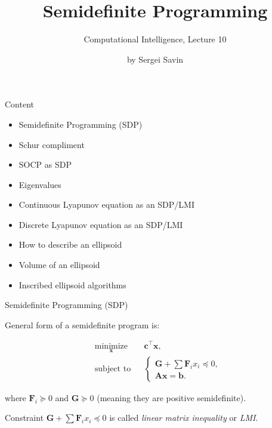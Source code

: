 \documentclass{beamer}
\title{Semidefinite Programming}
\subtitle{Computational Intelligence, Lecture 10}
\author{by Sergei Savin}
\date{\mydate}
\begin{document}
\maketitle


\begin{frame}{Content}

\begin{itemize}
\item  Semidefinite Programming (SDP)
\item  Schur compliment
\item  SOCP as SDP
\item  Eigenvalues
\item  Continuous Lyapunov equation as an SDP/LMI
\item  Discrete Lyapunov equation as an SDP/LMI
\item How to describe an ellipsoid
\item Volume of an ellipsoid
\item Inscribed ellipsoid algorithms
\end{itemize}
\end{frame}



\begin{frame}{Semidefinite Programming (SDP)}
\begin{flushleft}

General form of a semidefinite program is:

%
\begin{equation}
\begin{aligned}
& \underset{\mathbf{x}}{\text{minimize}}
& & \mathbf{c}^\top\mathbf{x}, \\
& \text{subject to}
& & \begin{cases}
    \mathbf{G} + \sum \mathbf{F}_i x_i \preceq 0, \\
    \mathbf{A}\mathbf{x} = \mathbf{b}.
    \end{cases}
\end{aligned}
\end{equation}

where $\mathbf{F}_i \succeq 0$ and $\mathbf{G} \succeq 0$ (meaning they are positive semidefinite).

\bigskip

Constraint $\mathbf{G} + \sum \mathbf{F}_i x_i \preceq 0$ is called \emph{linear matrix inequality} or \emph{LMI}.
 
\end{flushleft}
\end{frame}
\end{document}
